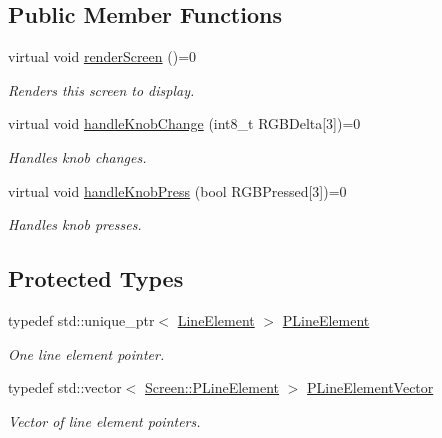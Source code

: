 \subsection*{Public Member Functions}
\begin{DoxyCompactItemize}
\item 
\mbox{\label{classScreen_afd1cb4a4bfbbec56cc64c973a9242110}} 
virtual void \mbox{\hyperlink{classScreen_afd1cb4a4bfbbec56cc64c973a9242110}{render\+Screen}} ()=0
\begin{DoxyCompactList}\small\item\em Renders this screen to display. \end{DoxyCompactList}\item 
\mbox{\label{classScreen_a4c3869a19704ec2530a377618b3f6104}} 
virtual void \mbox{\hyperlink{classScreen_a4c3869a19704ec2530a377618b3f6104}{handle\+Knob\+Change}} (int8\+\_\+t R\+G\+B\+Delta\mbox{[}3\mbox{]})=0
\begin{DoxyCompactList}\small\item\em Handles knob changes. \end{DoxyCompactList}\item 
\mbox{\label{classScreen_a1b9547f8f48c3ceae2024b58e0746e94}} 
virtual void \mbox{\hyperlink{classScreen_a1b9547f8f48c3ceae2024b58e0746e94}{handle\+Knob\+Press}} (bool R\+G\+B\+Pressed\mbox{[}3\mbox{]})=0
\begin{DoxyCompactList}\small\item\em Handles knob presses. \end{DoxyCompactList}\end{DoxyCompactItemize}
\subsection*{Protected Types}
\begin{DoxyCompactItemize}
\item 
\mbox{\label{classScreen_a3696376a0036dc304d337dc5e697d6f9}} 
typedef std\+::unique\+\_\+ptr$<$ \mbox{\hyperlink{classScreen_1_1LineElement}{Line\+Element}} $>$ \mbox{\hyperlink{classScreen_a3696376a0036dc304d337dc5e697d6f9}{P\+Line\+Element}}
\begin{DoxyCompactList}\small\item\em One line element pointer. \end{DoxyCompactList}\item 
\mbox{\label{classScreen_a62e857d5d7fcfd58fe241c1e933ac3bb}} 
typedef std\+::vector$<$ \mbox{\hyperlink{classScreen_a3696376a0036dc304d337dc5e697d6f9}{Screen\+::\+P\+Line\+Element}} $>$ \mbox{\hyperlink{classScreen_a62e857d5d7fcfd58fe241c1e933ac3bb}{P\+Line\+Element\+Vector}}
\begin{DoxyCompactList}\small\item\em Vector of line element pointers. \end{DoxyCompactList}\end{DoxyCompactItemize}
